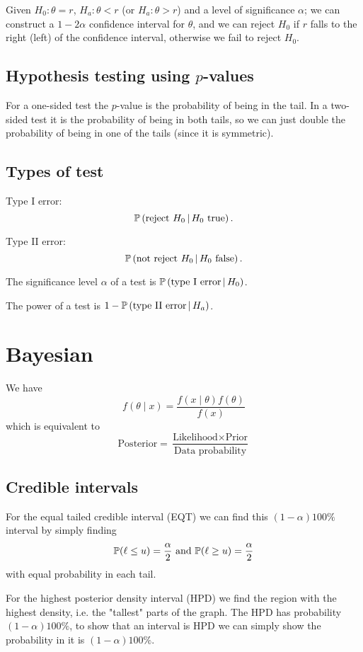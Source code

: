 \documentclass[10pt, a4paper]{article}
\begin{document}
Given $H_0 : \theta = r$,
$H_a : \theta < r$
(or $H_a : \theta > r$)
and a level of significance $\alpha$;
we can construct a $1 - 2\alpha$ confidence interval for $\theta$,
and we can reject $H_0$ if $r$ falls to the right
(left)
of the confidence interval,
otherwise we fail to reject $H_0$.

\subsection{Hypothesis testing using \texorpdfstring{$p$}{}-values}

For a one-sided test the $p$-value is the probability of being in the tail.
In a two-sided test it is the probability of being in both tails,
so we can just double the probability of being in one of the tails
(since it is symmetric).

\subsection{Types of test}
Type I error:
\[
\cP{\text{reject $H_0$}}{\text{$H_0$ true}}.
\]

Type II error:
\[
\cP{\text{not reject $H_0$}}{\text{$H_0$ false}}.
\]

The significance level $\alpha$ of a test is $\cP{\text{type I error}}{H_0}$.

The power of a test is $1 - \cP{\text{type II error}}{H_a}$.

\newpage

\section{Bayesian}

We have
\[
f(\theta\mid x) = \frac{f(x\mid \theta)f(\theta)}{f(x)}
\]
which is equivalent to
\[
\text{Posterior} = \frac{\text{Likelihood} \times \text{Prior}}{\text{Data probability}}
\]

\subsection{Credible intervals}
For the equal tailed credible interval
(EQT)
we can find this $(1 - \alpha)100\%$ interval by simply finding
\[
\P(\ell \leq u) = \frac{\alpha}{2} \text{ and } \P(\ell \geq u) = \frac{\alpha}{2}
\]
with equal probability in each tail.

For the highest posterior density interval
(HPD)
we find the region with the highest density,
i.e.
the "tallest" parts of the graph.
The HPD has probability $(1 - \alpha)100\%$,
to show that an interval is HPD we can simply show the probability in it is $(1 - \alpha)100\%$.
\end{document}
